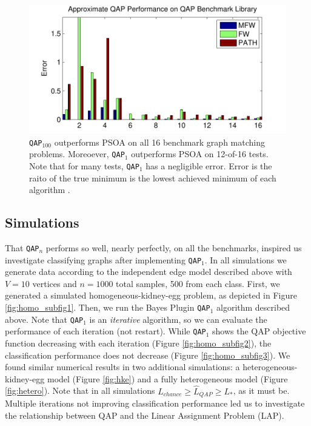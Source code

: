 \documentclass{article} %
\providecommand{\mh}[1]{\hat{#1}}
\newcommand{\qapa}{\texttt{QAP$_1$} }
\newcommand{\qapn}{\texttt{QAP$_n$} }
\newcommand{\qapb}{\texttt{QAP$_{100}$} }
\begin{document}
\begin{figure}[htbp]
	\centering			
	\includegraphics[width=1.0\linewidth]{../figs/benchmarks.pdf}
	\caption{\qapb outperforms PSOA on all 16 benchmark graph matching problems.  Moreoever, \qapa outperforms PSOA on 12-of-16 tests.  Note that for many tests, \qapa has a negligible error. Error is the raito of the true minimum is the lowest achieved minimum of each algorithm .}
	\label{fig:fwpath}
\end{figure}




\subsection{Simulations}

That \qapn performs so well, nearly perfectly, on all the benchmarks, inspired us investigate classifying graphs after implementing \texttt{QAP}$_1$.  In all simulations we generate data according to the independent edge model described above with $V=10$ vertices and $n=1000$ total samples, 500 from each class.  First, we generated a simulated homogeneous-kidney-egg problem, as depicted in Figure \ref{fig:homo_subfig1}.  Then, we run the Bayes Plugin \qapa algorithm described above.  Note that \qapa is an \emph{iterative} algorithm, so we can evaluate the performance of each iteration (not restart). While \qapa shows the QAP objective function decreasing with each iteration (Figure \ref{fig:homo_subfig2}), the classification performance does not decrease (Figure \ref{fig:homo_subfig3}).  We found similar numerical results in two additional simulations: a heterogeneous-kidney-egg model (Figure \ref{fig:hke}) and a fully heterogeneous model (Figure \ref{fig:hetero}). Note that in all simulations $L_{chance} \geq \mh{L}_{QAP} \geq L_*$, as it must be.  Multiple iterations not improving classification performance led us to investigate the relationship between QAP and the Linear Assignment Problem (LAP).
\end{document}

